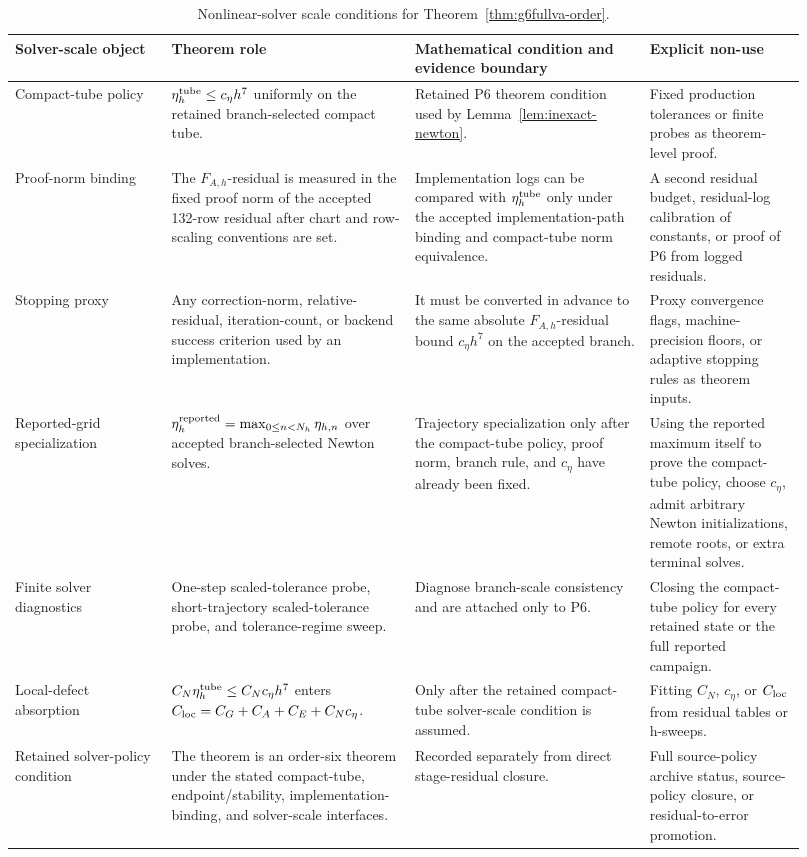 \documentclass[preprint,12pt]{elsarticle}
\begin{document}
\begin{table}[htbp]
\centering
\caption{Nonlinear-solver scale conditions for
Theorem~\ref{thm:g6fullva-order}.}
\label{tab:nonlinear-solver-scale-ledger}
\scriptsize
\setlength{\tabcolsep}{2pt}
\renewcommand{\arraystretch}{0.9}
\begin{tabular}{P{0.18\linewidth}P{0.29\linewidth}P{0.27\linewidth}P{0.18\linewidth}}
\toprule
Solver-scale object & Theorem role & Mathematical condition and evidence boundary & Explicit non-use \\
\midrule
Compact-tube policy &
\(\eta_h^{\rm tube}\le c_\eta h^7\) uniformly on the retained
branch-selected compact tube. &
Retained P6 theorem condition used by Lemma~\ref{lem:inexact-newton}. &
Fixed production tolerances or finite probes as theorem-level proof. \\
Proof-norm binding &
The \(F_{A,h}\)-residual is measured in the fixed proof norm of the accepted
132-row residual after chart and row-scaling conventions are set. &
Implementation logs can be compared with \(\eta_h^{\rm tube}\) only under the
accepted implementation-path binding and compact-tube norm equivalence. &
A second residual budget, residual-log calibration of constants, or proof of
P6 from logged residuals. \\
Stopping proxy &
Any correction-norm, relative-residual, iteration-count, or backend success
criterion used by an implementation. &
It must be converted in advance to the same absolute
\(F_{A,h}\)-residual bound \(c_\eta h^7\) on the accepted branch. &
Proxy convergence flags, machine-precision floors, or adaptive stopping rules
as theorem inputs. \\
Reported-grid specialization &
\(\eta_h^{\rm reported}=\max_{0\le n<N_h}\eta_{h,n}\) over accepted branch-selected Newton
solves. &
Trajectory specialization only after the compact-tube policy, proof norm,
branch rule, and \(c_\eta\) have already been fixed. &
Using the reported maximum itself to prove the compact-tube policy, choose
\(c_\eta\), admit arbitrary Newton initializations, remote roots, or extra
terminal solves. \\
Finite solver diagnostics &
One-step scaled-tolerance probe, short-trajectory scaled-tolerance probe, and
tolerance-regime sweep. &
Diagnose branch-scale consistency and are attached only to P6. &
Closing the compact-tube policy for every retained state or the full reported
campaign. \\
Local-defect absorption &
\(C_N\eta_h^{\rm tube}\le C_Nc_\eta h^7\) enters
\(C_{\rm loc}=C_G+C_A+C_E+C_Nc_\eta\). &
Only after the retained compact-tube solver-scale condition is assumed. &
Fitting \(C_N\), \(c_\eta\), or \(C_{\rm loc}\) from residual tables or
h-sweeps. \\
Retained solver-policy condition &
The theorem is an order-six theorem under the stated compact-tube,
endpoint/stability, implementation-binding, and solver-scale interfaces. &
Recorded separately from direct stage-residual closure. &
Full source-policy archive status, source-policy closure, or residual-to-error
promotion. \\
\bottomrule
\end{tabular}
\end{table}
\end{document}
